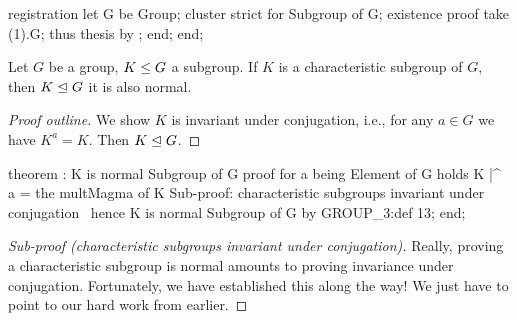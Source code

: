 \nwenddocs{}\endmoddef\nwstartdeflinemarkup{}\nwenddeflinemarkup
registration
  let G be Group;
  cluster strict  for Subgroup of G;
  existence
  proof
    take (1).G;
    thus thesis by ;
  end;
end;
\nwendcode{}\nwdocspar

\begin{theorem}
Let $G$ be a group, $K\leq G$ a subgroup. If $K$ is a
characteristic subgroup of $G$, then $K\trianglelefteq G$ it is also
normal.
\end{theorem}

\begin{proof}[Proof outline]
We show $K$ is invariant under conjugation, i.e., for any $a\in G$ we
have $K^{a}=K$. Then $K\trianglelefteq G$.
\end{proof}

\nwenddocs{}\endmoddef\nwstartdeflinemarkup{}\nwenddeflinemarkup
theorem :
  K is normal Subgroup of G
proof
  for a being Element of G holds K |^ a = the multMagma of K
  \LA{}Sub-proof: characteristic subgroups invariant under conjugation~{\nwtagstyle{}}\RA{}
  hence K is normal Subgroup of G by GROUP_3:def 13;
end;
\eatline
{}\nwendcode{}\nwdocspar
\begin{proof}[Sub-proof (characteristic subgroups invariant under conjugation)]
Really, proving a characteristic subgroup is normal amounts to proving
invariance under conjugation. Fortunately, we have established this
along the way! We just have to point to our hard work from earlier.
\end{proof}

